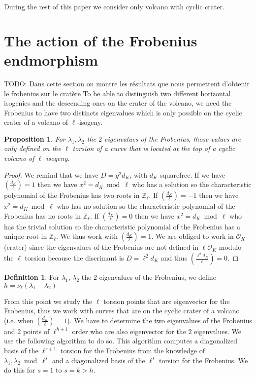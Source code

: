 \documentclass{article}
\newcommand{\todo}[1]{{\color{red}TODO: #1}}
\theoremstyle{plain}
\newtheorem{prop}[thm]{Proposition}
\theoremstyle{definition}
\newtheorem{defi}[thm]{Definition}
\theoremstyle{remark}
\begin{document}
During the rest of this paper we consider only volcano with cyclic crater.


\section{The action of the Frobenius endmorphism}
\label{sec:acti-frob-endm}
\todo{Dans cette section on montre les résultats que nous permettent d'obtenir le frobenius sur le cratère}
To be able to distinguish two different horizontal isogenies and the descending ones on the crater of the volcano, we need the Frobenius to have two distincts eigenvalues which is only possible on the cyclic crater of a volcano of $\ell$-isogeny.

\begin{prop}
For $\lambda_1 , \lambda_2$ the $2$ eigenvalues of the Frobenius, those values are only defined on the $\ell$ torsion of a curve that is located at the top of a cyclic volcano of $\ell$ isogeny.
\end{prop}

\begin{proof}
We remind that we have $D=g^2d_K$, with $d_K$ squarefree.
\newline
If we have $\left( \frac{d_K}{\ell} \right)=1$ then we have $x^2 = d_K \bmod \ell$ who has a solution so the characteristic polynomial of the Frobenius has two roots in $\mathbb{Z}_{\ell}$. If $\left( \frac{d_K}{\ell} \right)=-1$ then we have $x^2 = d_K \bmod \ell$ who has no solution so the characteristic polynomial of the Frobenius has no roots in $\mathbb{Z}_{\ell}$. If $\left( \frac{d_K}{\ell} \right)=0$ then we have $x^2 = d_K \bmod \ell$ who has the trivial solution so the characteristic polynomial of the Frobenius has a unique root in $\mathbb{Z}_{\ell}$.
\newline
We thus work with $\left( \frac{d_K}{\ell} \right)=1$. We are obliged to work in $\mathcal{O}_K$ (crater)  since the eigenvalues of the Frobenius are not defined in $\ell \mathcal{O}_K$ modulo the $\ell$ torsion because the discrimant is $D=\ell^2 d_K$ and thus $\left( \frac{\ell^2 d_K}{\ell} \right)=0$.
\end{proof}

\begin{defi}
For $\lambda_1$, $\lambda_2$ the $2$ eigenvalues of the Frobenius, we define $h=\nu_{\ell} \left( \lambda_1 - \lambda_2 \right)$
\end{defi}

From this point we study the $\ell$ torsion points that are eigenvector for the Frobenius, thus we work with curves that are on the cyclic crater of a volcano (i.e. when $\left( \frac{d_K}{\ell} \right)=1$). We have to determine  the two eigenvalues of the Frobenius and $2$ points of $\ell^{h+1}$ order who are also eigenvector for the $2$ eigenvalues. We use the following algorithm to do so. This algorithm computes a diagonalized basis of the $\ell^{s+1}$ torsion for the Frobenius from the knowledge of $\lambda_1, \lambda_2 \bmod \ell^s$ and a diagonalized basis of the $\ell^s$ torsion for the Frobenius. We do this for $s=1$ to $s=k>h$.
\end{document}
